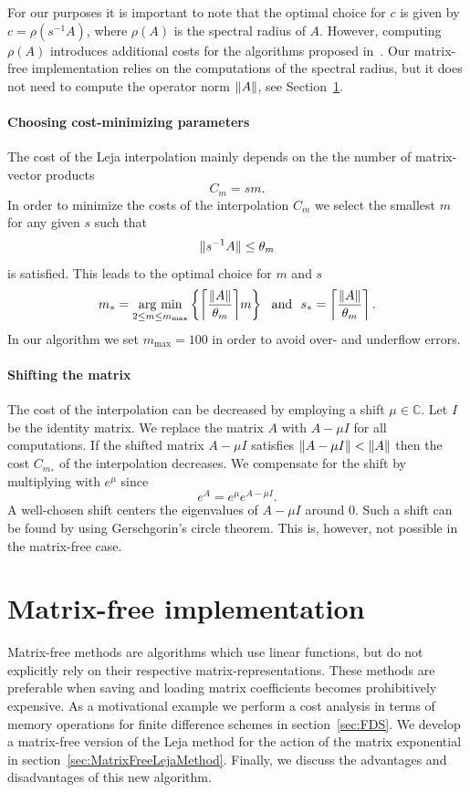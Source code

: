 \documentclass{scrartcl}
\begin{document}
	For our purposes it is important to note that the optimal choice for $c$ is given by $c=\rho(s^{-1}A)$, where $\rho(A)$ is the spectral radius of $A$. However, computing $\rho(A)$ introduces additional costs for the algorithms proposed in~\cite{lejarev}. Our matrix-free implementation relies on the computations of the spectral radius, but it does not need to compute the operator norm $\lVert A\rVert$, see Section~\ref{sec:matrixfreeimplementation}.
	
	\paragraph{Choosing cost-minimizing parameters}
	The cost of the Leja interpolation mainly depends on the the number of matrix-vector products
	\[
	C_{m} = sm. 
	\]
	In order to minimize the costs of the interpolation $C_m$ we select the smallest $m$ for any given $s$ such that
	\[
	\lVert s^{-1}A\rVert \le \theta_m
	\]
	is satisfied. This leads to the optimal choice for $m$ and $s$ 
	\begin{align}
	\begin{split}
	m_* = \underset{2\le m\le m_{\operatorname{max}}}{\operatorname{arg\ min}}  \left\{{\left\lceil{\frac{\norm{A}}{\theta_m}}\right\rceil}m\right\} ~~\text{and}~~
	s_* =  \left\lceil{\frac{\norm{A}}{\theta_m}}\right\rceil.
	\end{split} \label{eq:ms}
	\end{align}
	In our algorithm we set $m_{\operatorname{max}} = 100$ in order to avoid over- and underflow errors.
	
	\paragraph{Shifting the matrix}
	The cost of the interpolation can be decreased by employing a shift $\mu\in\mathbb{C}$. Let $I$ be the identity matrix. We replace the matrix $A$ with $A-\mu I$ for all computations. If the shifted matrix $A-\mu I$ satisfies $\lVert A -\mu I\rVert < \lVert A\rVert$ then the cost $C_{m_*}$ of the interpolation decreases.
	We compensate for the shift by multiplying with $e^\mu$ since
	\[
	e^{A} = e^{\mu}e^{A-\mu I}.
	\]
	A well-chosen shift centers the eigenvalues of $A-\mu I$ around $0$. Such a shift can be found by using Gerschgorin's circle theorem. This is, however, not possible in the matrix-free case.
	
\section{Matrix-free implementation}\label{sec:matrixfreeimplementation}
	Matrix-free methods are algorithms which use linear functions, but do not explicitly rely on their respective matrix-representations. These methods are preferable when saving and loading matrix coefficients becomes prohibitively expensive. As a motivational example we perform a cost analysis in terms of memory operations for finite difference schemes in section~\ref{sec:FDS}.
	We develop a matrix-free version of the Leja method for the action of the matrix exponential in section~\ref{sec:MatrixFreeLejaMethod}. Finally, we discuss the advantages and disadvantages of this new algorithm.
\end{document}
